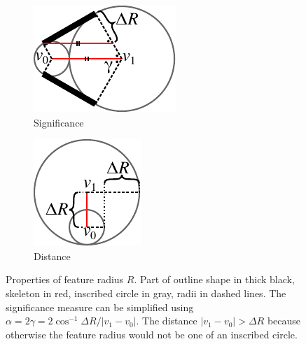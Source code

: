 \begin{figure} \centering
\begin{subfigure}{0.45\columnwidth} \centering
\includegraphics[height=.7\columnwidth]{sources/method/distance_based_angles.pdf}
\caption{Significance}
\label{distance_based_angles}
\end{subfigure}
\begin{subfigure}{0.45\columnwidth} \centering
\includegraphics[height=.7\columnwidth]{sources/method/distance_ratio_limit.pdf}
\caption{Distance}
\label{distance_ratio_limit}
\end{subfigure}
\caption{
Properties of feature radius $R$.
Part of outline shape in thick black,
skeleton in red,
inscribed circle in gray,
radii in dashed lines.
The significance measure can be simplified using $\alpha = 2 \gamma = 2 \cos^{-1} \Delta R / |v_1 - v_0|$.
The distance $|v_1 - v_0| > \Delta R$ because otherwise the feature radius would not be one of an inscribed circle.
}
\end{figure}



